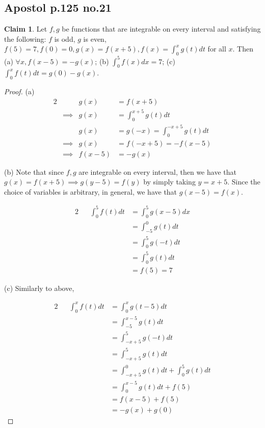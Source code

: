 \documentclass[12pt,letterpaper]{article}
\theoremstyle{definition}
\newtheorem*{claim}{Claim}
\begin{document}
\subsection*{Apostol p.125 no.21}

\begin{claim}
  Let $f,g$ be functions that are integrable on every interval and satisfying
  the following: $f$ is odd, $g$ is even, $f(5) = 7, f(0) = 0, g(x) = f(x+5),
  f(x) = \int_0^xg(t)dt$ for all $x$. Then (a) $\forall x, f(x-5) = -g(x)$; (b)
  $\int_0^5f(x)dx = 7$; (c) $\int_0^xf(t)dt = g(0) - g(x)$.
\end{claim}

\begin{proof}
  (a)
  \begin{alignat*}{2}
    && g(x) &= f(x + 5) \\
    &\implies& g(x) &= \int_0^{x+5}g(t)dt \\
    && g(x) &= g(-x) = \int_0^{-x + 5}g(t)dt \\
    &\implies& g(x) &= f(-x + 5) = -f(x - 5) \\
    &\implies& f(x - 5) &= -g(x)
  \end{alignat*}

  (b) Note that since $f,g$ are integrable on every interval, then we have that
  $g(x) = f(x + 5) \implies g(y - 5) = f(y)$ by simply taking $y = x + 5$. Since
  the choice of variables is arbitrary, in general, we have that $g(x - 5) = f(x)$.

  
  \begin{alignat*}{2}
    && \int_0^5f(t)dt &= \int_0^5g(x - 5)dx \\
    && &=\int_{-5}^0g(t)dt \\
    && &=\int_0^5g(-t)dt \\
    && &=\int_0^5g(t)dt \\
    && &=f(5) = 7
  \end{alignat*}

  (c) Similarly to above,

  \begin{alignat*}{2}
    && \int_0^xf(t)dt &= \int_0^xg(t - 5)dt \\
    && &=\int_{-5}^{x-5}g(t)dt \\
    && &=\int_{-x + 5}^5g(-t)dt \\
    && &=\int_{-x+5}^5g(t)dt \\
    && &=\int_{-x+5}^0g(t)dt + \int_0^5g(t)dt \\
    && &=\int_0^{x-5}g(t)dt + f(5) \\
    && &=f(x-5) + f(5) \\
    && &= -g(x) + g(0)
  \end{alignat*}
\end{proof}
\end{document}
